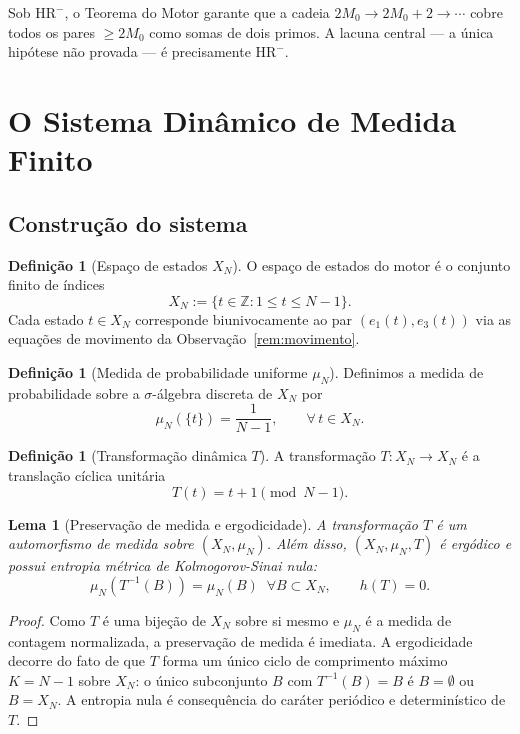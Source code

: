 \documentclass[12pt,a4paper]{article}
\newtheorem{lemma}[theorem]{Lema}
\theoremstyle{definition}
\newtheorem{definition}[theorem]{Definição}
\newcommand{\Z}{\mathbb{Z}}
\newcommand{\HRm}{\mathrm{HR}^{-}}
\begin{document}
	Sob $\HRm$, o Teorema do Motor \cite[Thm.~7.3]{motor} garante que a
	cadeia $2M_0 \to 2M_0 + 2 \to \cdots$ cobre todos os pares $\geq 2M_0$
	como somas de dois primos. A lacuna central — a única hipótese não provada
	— é precisamente $\HRm$.
	
	\section{O Sistema Dinâmico de Medida Finito}
	\label{sec:dinamica}
	
	\subsection{Construção do sistema}
	
	\begin{definition}[Espaço de estados $X_N$]
		\label{def:estados}
		O espaço de estados do motor é o conjunto finito de índices
		\[
		X_N := \{t \in \Z : 1 \leq t \leq N-1\}.
		\]
		Cada estado $t \in X_N$ corresponde biunivocamente ao par $(e_1(t),
		e_3(t))$ via as equações de movimento da Observação~\ref{rem:movimento}.
	\end{definition}
	
	\begin{definition}[Medida de probabilidade uniforme $\mu_N$]
		Definimos a medida de probabilidade sobre a $\sigma$-álgebra discreta
		de $X_N$ por
		\[
		\mu_N(\{t\}) = \frac{1}{N-1},\qquad \forall\, t \in X_N.
		\]
	\end{definition}
	
	\begin{definition}[Transformação dinâmica $T$]
		A transformação $T: X_N \to X_N$ é a translação cíclica unitária
		\[
		T(t) = t + 1 \pmod{N-1}.
		\]
	\end{definition}
	
	\begin{lemma}[Preservação de medida e ergodicidade]
		\label{lem:ergodico}
		A transformação $T$ é um automorfismo de medida sobre $(X_N, \mu_N)$.
		Além disso, $(X_N, \mu_N, T)$ é ergódico e possui entropia métrica de
		Kolmogorov-Sinai nula:
		\[
		\mu_N(T^{-1}(B)) = \mu_N(B)\;\;\forall B \subset X_N,\qquad h(T) = 0.
		\]
	\end{lemma}
	
	\begin{proof}
		Como $T$ é uma bijeção de $X_N$ sobre si mesmo e $\mu_N$ é a medida
		de contagem normalizada, a preservação de medida é imediata. A
		ergodicidade decorre do fato de que $T$ forma um único ciclo de
		comprimento máximo $K = N-1$ sobre $X_N$: o único subconjunto $B$ com
		$T^{-1}(B) = B$ é $B = \emptyset$ ou $B = X_N$. A entropia nula é
		consequência do caráter periódico e determinístico de $T$.
	\end{proof}
	
\end{document}
